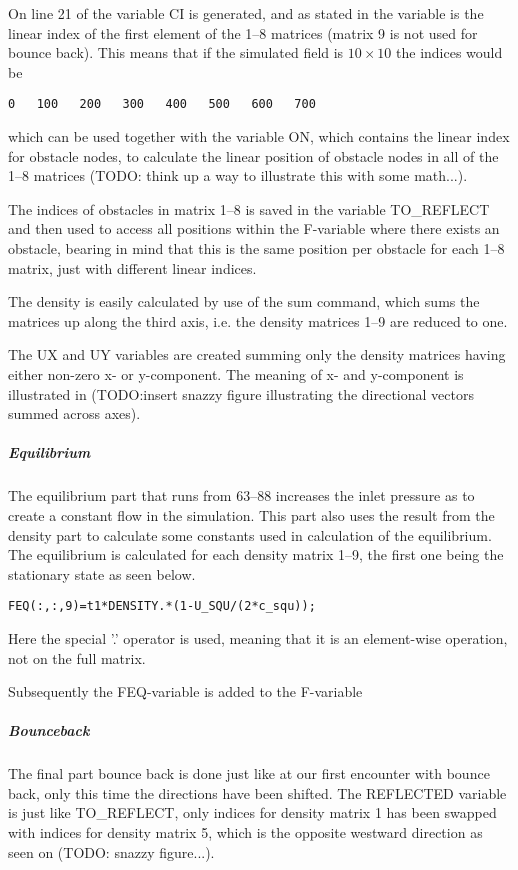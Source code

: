 On line 21 of  the variable CI is generated, and as stated in  the variable is the linear index of the first element of the 1--8 matrices (matrix 9 is not used for bounce back). This means that if the simulated field is $10\times10$ the indices would be

\begin{verbatim}
0   100   200   300   400   500   600   700
\end{verbatim}

which can be used together with the variable ON, which contains the linear index for obstacle nodes, to calculate the linear position of obstacle nodes in all of the 1--8 matrices (TODO: think up a way to illustrate this with some math...).

The indices of obstacles in matrix 1--8 is saved in the variable TO\_REFLECT and then used to access all positions within the F-variable where there exists an obstacle, bearing in mind that this is the same position per obstacle for each 1--8 matrix, just with different linear indices.

The density is easily calculated by use of the sum command, which sums the matrices up along the third axis, i.e. the density matrices 1--9 are reduced to one.

The UX and UY variables are created summing only the density matrices having either non-zero x- or y-component. The meaning of x- and y-component is illustrated in (TODO:insert snazzy figure illustrating the directional vectors summed across axes).

\subparagraph*{Equilibrium}
The equilibrium part that runs from 63--88 increases the inlet pressure as to create a constant flow in the simulation. This part also uses the result from the density part to calculate some constants used in calculation of the equilibrium. The equilibrium is calculated for each density matrix 1--9, the first one being the stationary state as seen below.

\begin{verbatim}
FEQ(:,:,9)=t1*DENSITY.*(1-U_SQU/(2*c_squ));
\end{verbatim}

Here the special '.' operator is used, meaning that it is an element-wise operation, not on the full matrix.

Subsequently the FEQ-variable is added to the F-variable

\subparagraph*{Bounceback}
The final part bounce back is done just like at our first encounter with bounce back, only this time the directions have been shifted. The REFLECTED variable is just like TO\_REFLECT, only indices for density matrix 1 has been swapped with indices for density matrix 5, which is the opposite westward direction as seen on (TODO: snazzy figure...).

